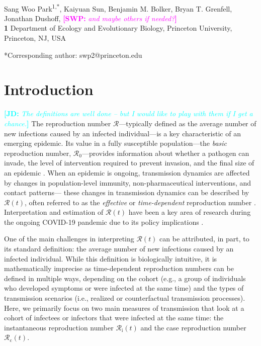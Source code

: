 \documentclass[12pt]{article}
\date{\today}
\newcommand{\comment}{\showcomment}
\newcommand{\showcomment}[3]{\textcolor{#1}{\textbf{[#2: }\textsl{#3}\textbf{]}}}
\newcommand{\jd}[1]{\comment{cyan}{JD}{#1}}
\newcommand{\swp}[1]{\comment{magenta}{SWP}{#1}}
\newcommand{\Rx}[1]{\ensuremath{{\mathcal R}_{#1}}\xspace}
\newcommand{\Ro}{\Rx{0}}
\newcommand{\Rc}{\Rx{\mathrm{c}}}
\newcommand{\Ri}{\Rx{\mathrm{i}}}
\newcommand{\RR}{\ensuremath{{\mathcal R}}\xspace}
\begin{document}
\begin{flushleft}{
	\Large
	\textbf{}
}
\newline
\\
Sang Woo Park\textsuperscript{1,*}, Kaiyuan Sun, Benjamin M. Bolker, Bryan T. Grenfell, Jonathan Dushoff, \swp{and maybe others if needed?}
\\
\bigskip
\textbf{1} Department of Ecology and Evolutionary Biology, Princeton University, Princeton, NJ, USA
\\
\bigskip

*Corresponding author: swp2@princeton.edu
\end{flushleft}

\section{Introduction}

\jd{The definitions are well done -- but I would like to play with them if I get a chance.}
The reproduction number \RR---typically defined as the average number of new infections caused by an infected individual---is a key characteristic of an emerging epidemic.
Its value in a fully susceptible population---the \emph{basic} reproduction number, \Ro---provides information about whether a pathogen can invade, the level of intervention required to prevent invasion, and the final size of an epidemic \citep{diekmann1990definition,anderson1991infectious}.
When an epidemic is ongoing, transmission dynamics are affected by changes in population-level immunity, non-pharmaceutical interventions, and contact patterns---
these changes in transmission dynamics can be described by $\RR(t)$, often referred to as the \emph{effective} or \emph{time-dependent} reproduction number \citep{wallinga2004different, fraser2007estimating, cori2013new}.
Interpretation and estimation of $\RR(t)$ have been a key area of research during the ongoing COVID-19 pandemic due to its policy implications \citep{pan2020association,flaxman2020estimating,gostic2020practical}.

One of the main challenges in interpreting $\RR(t)$ can be attributed, in part, to its standard definition: the average number of new infections caused by an infected individual.
While this definition is biologically intuitive, it is mathematically imprecise as time-dependent reproduction numbers can be defined in multiple ways, depending on the cohort (e.g., a group of individuals who developed symptoms or were infected at the same time) and the types of transmission scenarios (i.e., realized or counterfactual transmission processes).
Here, we primarily focus on two main measures of transmission that look at a cohort of infectees or infectors that were infected at the same time: the instantaneous reproduction number $\Ri(t)$ and the case reproduction number $\Rc(t)$.
\end{document}
